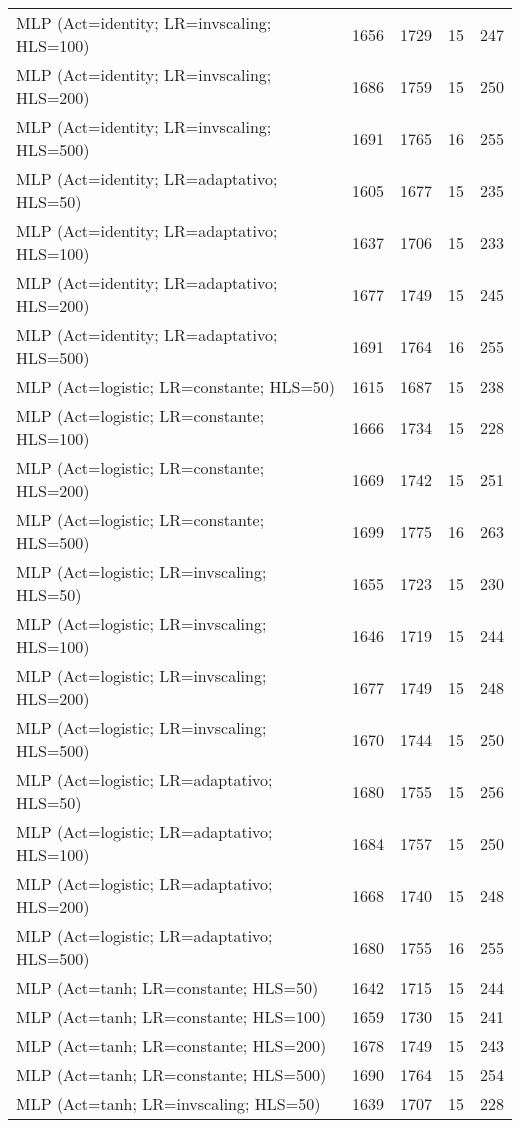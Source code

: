 \begin{center}
\begin{longtable}{|l|l|l|l|l|}
MLP (Act=identity; LR=invscaling; HLS=100) & 1656 & 1729 & 15 & 247 \\
MLP (Act=identity; LR=invscaling; HLS=200) & 1686 & 1759 & 15 & 250 \\
MLP (Act=identity; LR=invscaling; HLS=500) & 1691 & 1765 & 16 & 255 \\
MLP (Act=identity; LR=adaptativo; HLS=50) & 1605 & 1677 & 15 & 235 \\
MLP (Act=identity; LR=adaptativo; HLS=100) & 1637 & 1706 & 15 & 233 \\
MLP (Act=identity; LR=adaptativo; HLS=200) & 1677 & 1749 & 15 & 245 \\
MLP (Act=identity; LR=adaptativo; HLS=500) & 1691 & 1764 & 16 & 255 \\
MLP (Act=logistic; LR=constante; HLS=50) & 1615 & 1687 & 15 & 238 \\
MLP (Act=logistic; LR=constante; HLS=100) & 1666 & 1734 & 15 & 228 \\
MLP (Act=logistic; LR=constante; HLS=200) & 1669 & 1742 & 15 & 251 \\
MLP (Act=logistic; LR=constante; HLS=500) & 1699 & 1775 & 16 & 263 \\
MLP (Act=logistic; LR=invscaling; HLS=50) & 1655 & 1723 & 15 & 230 \\
MLP (Act=logistic; LR=invscaling; HLS=100) & 1646 & 1719 & 15 & 244 \\
MLP (Act=logistic; LR=invscaling; HLS=200) & 1677 & 1749 & 15 & 248 \\
MLP (Act=logistic; LR=invscaling; HLS=500) & 1670 & 1744 & 15 & 250 \\
MLP (Act=logistic; LR=adaptativo; HLS=50) & 1680 & 1755 & 15 & 256 \\
MLP (Act=logistic; LR=adaptativo; HLS=100) & 1684 & 1757 & 15 & 250 \\
MLP (Act=logistic; LR=adaptativo; HLS=200) & 1668 & 1740 & 15 & 248 \\
MLP (Act=logistic; LR=adaptativo; HLS=500) & 1680 & 1755 & 16 & 255 \\
MLP (Act=tanh; LR=constante; HLS=50) & 1642 & 1715 & 15 & 244 \\
MLP (Act=tanh; LR=constante; HLS=100) & 1659 & 1730 & 15 & 241 \\
MLP (Act=tanh; LR=constante; HLS=200) & 1678 & 1749 & 15 & 243 \\
MLP (Act=tanh; LR=constante; HLS=500) & 1690 & 1764 & 15 & 254 \\
MLP (Act=tanh; LR=invscaling; HLS=50) & 1639 & 1707 & 15 & 228 \\

\end{longtable}
\end{center}
